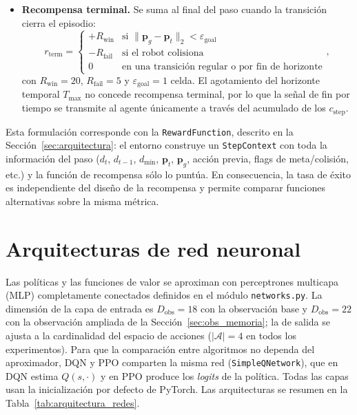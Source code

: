 \begin{itemize}
    utiliza $\lambda_{\text{prox}} = 10^{-2}$ y
    $D_{\text{safe}} = \tfrac{2}{3}\, d_{\max}$.
    \item \textbf{Recompensa terminal.} Se suma al final del paso cuando la
    transición cierra el episodio:
    \begin{equation}
        r_{\text{term}} = \begin{cases}
            +R_{\text{win}} & \text{si } \lVert \mathbf{p}_g - \mathbf{p}_t \rVert_2 < \varepsilon_{\text{goal}}\\
            -R_{\text{fail}} & \text{si el robot colisiona}\\
            0 & \text{en una transición regular o por fin de horizonte}
        \end{cases},
    \end{equation}
    con $R_{\text{win}} = 20$, $R_{\text{fail}} = 5$ y
    $\varepsilon_{\text{goal}} = 1$ celda. El agotamiento del horizonte
    temporal $T_{\max}$ no concede recompensa terminal, por lo que la señal
    de fin por tiempo se transmite al agente únicamente a través del
    acumulado de los $c_{\text{step}}$.
\end{itemize}

Esta formulación corresponde con la \texttt{RewardFunction}, descrito
en la Sección~\ref{sec:arquitectura}: el entorno construye un \texttt{StepContext} con
toda la información del paso ($d_t$, $d_{t-1}$, $d_{\min}$,
$\mathbf{p}_t$, $\mathbf{p}_g$, acción previa, flags de meta/colisión,
etc.) y la función de recompensa sólo lo puntúa. En consecuencia, la
tasa de éxito es independiente del diseño de la recompensa y permite
comparar funciones alternativas sobre la misma métrica.

\section{Arquitecturas de red neuronal}\label{sec:redes}
Las políticas y las funciones de valor se aproximan con perceptrones
multicapa (MLP) completamente conectados definidos en el módulo
\texttt{networks.py}. La dimensión de la capa de entrada es
$D_{\text{obs}} = 18$ con la observación base y $D_{\text{obs}} = 22$ con
la observación ampliada de la Sección~\ref{sec:obs_memoria}; la de salida
se ajusta a la cardinalidad del espacio de acciones ($|\mathcal{A}| = 4$
en todos los experimentos). Para que la comparación entre algoritmos no
dependa del aproximador, DQN y PPO comparten la misma red
(\texttt{SimpleQNetwork}), que en DQN estima $Q(s,\cdot)$ y en PPO
produce los \textit{logits} de la política. Todas las capas usan la
inicialización por defecto de PyTorch. Las arquitecturas se resumen en la
Tabla~\ref{tab:arquitectura_redes}.

